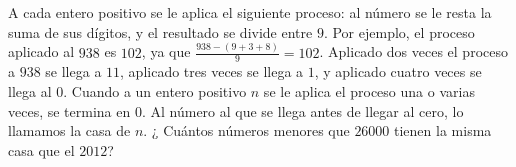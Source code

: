A cada entero positivo se le aplica el siguiente proceso: al número se le resta la suma de sus dígitos, y el resultado se divide entre $9$. Por ejemplo, el proceso aplicado al $938$ es $102$, ya que  $\frac{938-(9+3+8)}{9}=102$. Aplicado dos veces el proceso a $938$ se llega a $11$, aplicado tres veces se llega a $1$, y aplicado cuatro veces se llega al $0$. Cuando a un entero positivo $n$ se le aplica el proceso una o varias veces, se termina en $0$. Al número al que se llega antes de llegar al cero, lo llamamos la casa de $n$. ¿ Cuántos
números menores que $26000$ tienen la misma casa que el $2012$?